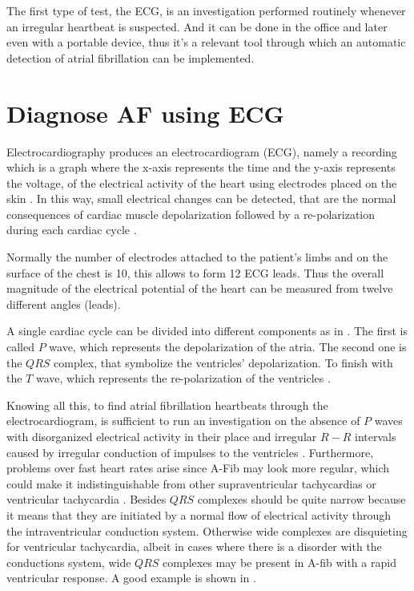 The first type of test, the ECG, is an investigation performed routinely whenever an irregular heartbeat is suspected. And it can be done in the office and later even with a portable device, thus it's a relevant tool through which an automatic detection of atrial fibrillation can be implemented.

\section{Diagnose AF using ECG}
\label{sec:ecg_diagnose}
Electrocardiography produces an electrocardiogram (ECG), namely a recording which is a graph where the x-axis represents the time and the y-axis represents the voltage, of the electrical activity of the heart using electrodes placed on the skin \cite[p.74]{lilly2015pathophysiology}. In this way, small electrical changes can be detected, that are the normal consequences of cardiac muscle depolarization followed by a re-polarization during each cardiac cycle .


Normally the number of electrodes attached to the patient's limbs and on the surface of the chest is 10, this allows to form 12 ECG leads. Thus the overall magnitude of the electrical potential of the heart can be measured from twelve different angles (leads). 

A single cardiac cycle can be divided into different components as in . The first is called $P$ wave, which represents the depolarization of the atria. The second one is the $QRS$ complex, that symbolize the ventricles' depolarization. To finish with the $T$ wave, which represents the re-polarization of the ventricles \cite[p.80]{lilly2015pathophysiology}.


Knowing all this, to find atrial fibrillation heartbeats through the electrocardiogram, is sufficient to run an investigation on the absence of $P$ waves with disorganized electrical activity in their place and irregular $R-R$ intervals caused by irregular conduction of impulses to the ventricles \cite{doi:10.1161/CIRCULATIONAHA.106.177292}. Furthermore, problems over fast heart rates arise since A-Fib may look more regular, which could make it indistinguishable from other supraventricular tachycardias or ventricular tachycardia \cite{issa2009clinical}.
Besides $QRS$ complexes should be quite narrow because it means that they are initiated by a normal flow of electrical activity through the intraventricular conduction system. Otherwise wide complexes are disquieting for ventricular tachycardia, albeit in cases where there is a disorder with the conductions system, wide $QRS$ complexes may be present in A-fib with a rapid ventricular response. A good example is shown in .

